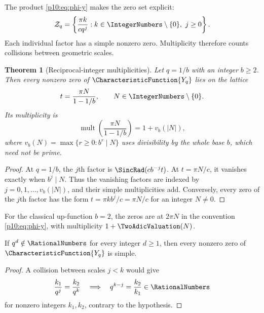 \documentclass[11pt]{article}
\numberwithin{equation}{section}
\newtheorem{theorem}{Theorem}[section]
\theoremstyle{definition}
\theoremstyle{remark}
\begin{document}
The product \eqref{p10:eq:phi-y} makes the zero set explicit:
\begin{equation}
 \mathcal Z_q
 =\left\{\frac{\pi k}{cq^j}: k\in\IntegerNumbers\setminus\{0\},\ j\ge0\right\}. \label{p10:eq:zero-set}
\end{equation}
Each individual factor has a simple nonzero zero.  Multiplicity therefore counts collisions
between geometric scales.

\begin{theorem}[Reciprocal-integer multiplicities]
\label{p10:thm:zero-multiplicity}
Let $q=1/b$ with an integer $b\ge2$.  Then every nonzero zero of $\CharacteristicFunction{Y_q}$ lies on the
lattice
\begin{equation}
 t=\frac{\pi N}{1-1/b},\qquad N\in\IntegerNumbers\setminus\{0\}.          \label{p10:eq:zero-lattice}
\end{equation}
Its multiplicity is
\begin{equation}
 \boxed{\displaystyle
 \operatorname{mult}\!\left(\frac{\pi N}{1-1/b}\right)
 =1+v_b(|N|),}                                               \label{p10:eq:zero-mult}
\end{equation}
where
\(
 v_b(N)=\max\{r\ge0:b^r\mid N\}
\)
uses divisibility by the whole base $b$, which need not be prime.
\end{theorem}

\begin{proof}
At $q=1/b$, the $j$th factor is
$\SincRad(cb^{-j}t)$.  At $t=\pi N/c$, it vanishes exactly when
$b^j\mid N$.  Thus the vanishing factors are indexed by
$j=0,1,\ldots,v_b(|N|)$, and their simple multiplicities add.  Conversely, every zero of the
$j$th factor has the form $t=\pi kb^j/c=\pi N/c$ for an integer $N\ne0$.
\end{proof}

For the classical up-function $b=2$, the zeros are at $2\pi N$ in the convention
\eqref{p10:eq:phi-y}, with multiplicity $1+\TwoAdicValuation(N)$.

\begin{proposition}
\label{p10:prop:generic-zeros}
If $q^d\notin\RationalNumbers$ for every integer $d\ge1$, then every nonzero zero of
$\CharacteristicFunction{Y_q}$ is simple.
\end{proposition}

\begin{proof}
A collision between scales $j<k$ would give
\[
 \frac{k_1}{q^j}=\frac{k_2}{q^k}
 \quad\Longrightarrow\quad
 q^{k-j}=\frac{k_2}{k_1}\in\RationalNumbers
\]
for nonzero integers $k_1,k_2$, contrary to the hypothesis.
\end{proof}
\end{document}
